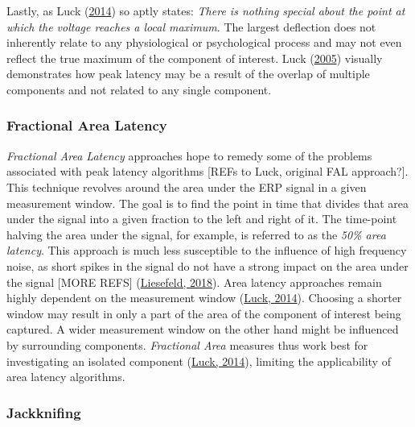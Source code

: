 \documentclass[
  man,floatsintext]{apa7}
\begin{document}
Lastly, as Luck (\protect\hyperlink{ref-luck2014introduction}{2014}) so aptly states: \emph{There is nothing special about the point at which the voltage reaches a local maximum}. The largest deflection does not inherently relate to any physiological or psychological process and may not even reflect the true maximum of the component of interest. Luck (\protect\hyperlink{ref-luck2005ten}{2005}) visually demonstrates how peak latency may be a result of the overlap of multiple components and not related to any single component.

\hypertarget{fractional-area-latency}{%
\subsubsection{Fractional Area Latency}\label{fractional-area-latency}}

\emph{Fractional Area Latency} approaches hope to remedy some of the problems associated with peak latency algorithms {[}REFs to Luck, original FAL approach?{]}. This technique revolves around the area under the ERP signal in a given measurement window. The goal is to find the point in time that divides that area under the signal into a given fraction to the left and right of it. The time-point halving the area under the signal, for example, is referred to as the \emph{50\% area latency}. This approach is much less susceptible to the influence of high frequency noise, as short spikes in the signal do not have a strong impact on the area under the signal {[}MORE REFS{]} (\protect\hyperlink{ref-liesefeld2018estimating}{Liesefeld, 2018}). Area latency approaches remain highly dependent on the measurement window (\protect\hyperlink{ref-luck2014introduction}{Luck, 2014}). Choosing a shorter window may result in only a part of the area of the component of interest being captured. A wider measurement window on the other hand might be influenced by surrounding components. \emph{Fractional Area} measures thus work best for investigating an isolated component (\protect\hyperlink{ref-luck2014introduction}{Luck, 2014}), limiting the applicability of area latency algorithms.

\hypertarget{jackknifing}{%
\subsubsection{Jackknifing}\label{jackknifing}}
\end{document}
